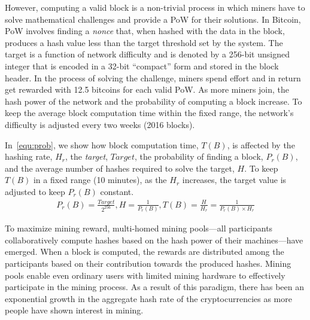 \documentclass[acmlarge]{acmart}
\begin{document}
However, computing a valid block is a non-trivial process in which miners have to solve mathematical challenges and provide a PoW for their solutions. In Bitcoin, PoW involves finding a \textit{nonce} that, when hashed with the data in the block, produces a hash value less than the target threshold set by the system. The target is a function of network difficulty and is denoted by a 256-bit unsigned integer that is encoded in a 32-bit ``compact'' form and stored in the block header. In the process of solving the challenge, miners spend effort and in return get rewarded with 12.5 bitcoins for each valid PoW. As more miners join, the hash power of the network and the probability of computing a block increase. To keep the average block computation time within the fixed range, the network's difficulty is adjusted every two weeks (2016 blocks).


In~\autoref{equ:prob}, we show how block computation time, $T(B)$, is affected by the hashing rate, $H_r$, the {\em target}, $Target$, the probability of finding a block, $P_r(B)$, and the average number of hashes required to solve the target, $H$. To keep  $T(B)$ in a fixed range (10 minutes), as the $H_r$ increases, the target value is adjusted to keep $P_r(B)$ constant. 
\begin{align} 
  \label{equ:prob}  P_r(B)  = \frac{Target}  {2^{256}},  H = \frac{1}{P_r(B)}, T(B) = \frac{H}{H_r} = \frac{1}{P_r(B)\times H_r}
\end{align}

To maximize mining reward, multi-homed mining pools---all participants collaboratively compute hashes based on the hash power of their machines---have emerged. When a block is computed, the rewards are distributed among the participants based on their contribution towards the produced hashes. Mining pools enable even ordinary users with limited mining hardware to effectively participate in the mining process. As a result of this paradigm, there has been an exponential growth in the aggregate hash rate of the cryptocurrencies as more people have shown interest in mining. 
\end{document}
